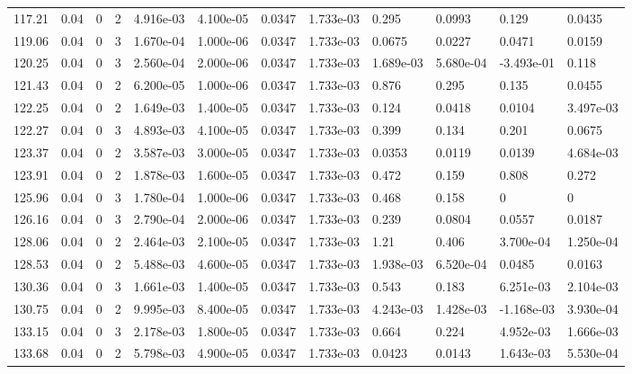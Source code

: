 \documentclass[preview]{standalone}
\begin{document}
{{{{\begin{tabular}{L{1.2cm}C{1.2cm} C{0.3cm}C{0.5cm} C{1.4cm}C{1.4cm} C{1.4cm}C{1.4cm} C{1.6cm}C{1.6cm} C{1.6cm}C{1.6cm}}
  117.21  &  0.04  & 0     &  2 &  4.916e-03  & 4.100e-05  &  0.0347&   1.733e-03& 0.295 & 0.0993   &  0.129 & 0.0435  \\ 
  119.06  &  0.04  & 0     &  3 &  1.670e-04  & 1.000e-06  &  0.0347&   1.733e-03& 0.0675 & 0.0227   &  0.0471 & 0.0159  \\ 
  120.25  &  0.04  & 0     &  3 &  2.560e-04  & 2.000e-06  &  0.0347&   1.733e-03& 1.689e-03 & 5.680e-04   &  -3.493e-01 & 0.118  \\ 
  121.43  &  0.04  & 0     &  2 &  6.200e-05  & 1.000e-06  &  0.0347&   1.733e-03& 0.876 & 0.295   &  0.135 & 0.0455  \\ 
  122.25  &  0.04  & 0     &  2 &  1.649e-03  & 1.400e-05  &  0.0347&   1.733e-03& 0.124 & 0.0418   &  0.0104 & 3.497e-03  \\ 
  122.27  &  0.04  & 0     &  3 &  4.893e-03  & 4.100e-05  &  0.0347&   1.733e-03& 0.399 & 0.134   &  0.201 & 0.0675  \\ 
  123.37  &  0.04  & 0     &  2 &  3.587e-03  & 3.000e-05  &  0.0347&   1.733e-03& 0.0353 & 0.0119   &  0.0139 & 4.684e-03  \\ 
  123.91  &  0.04  & 0     &  2 &  1.878e-03  & 1.600e-05  &  0.0347&   1.733e-03& 0.472 & 0.159   &  0.808 & 0.272  \\ 
  125.96  &  0.04  & 0     &  3 &  1.780e-04  & 1.000e-06  &  0.0347&   1.733e-03& 0.468 & 0.158   &  0 & 0  \\ 
  126.16  &  0.04  & 0     &  3 &  2.790e-04  & 2.000e-06  &  0.0347&   1.733e-03& 0.239 & 0.0804   &  0.0557 & 0.0187  \\ 
  128.06  &  0.04  & 0     &  2 &  2.464e-03  & 2.100e-05  &  0.0347&   1.733e-03& 1.21 & 0.406   &  3.700e-04 & 1.250e-04  \\ 
  128.53  &  0.04  & 0     &  2 &  5.488e-03  & 4.600e-05  &  0.0347&   1.733e-03& 1.938e-03 & 6.520e-04   &  0.0485 & 0.0163  \\ 
  130.36  &  0.04  & 0     &  3 &  1.661e-03  & 1.400e-05  &  0.0347&   1.733e-03& 0.543 & 0.183   &  6.251e-03 & 2.104e-03  \\ 
  130.75  &  0.04  & 0     &  2 &  9.995e-03  & 8.400e-05  &  0.0347&   1.733e-03& 4.243e-03 & 1.428e-03   &  -1.168e-03 & 3.930e-04  \\ 
  133.15  &  0.04  & 0     &  3 &  2.178e-03  & 1.800e-05  &  0.0347&   1.733e-03& 0.664 & 0.224   &  4.952e-03 & 1.666e-03  \\ 
  133.68  &  0.04  & 0     &  2 &  5.798e-03  & 4.900e-05  &  0.0347&   1.733e-03& 0.0423 & 0.0143   &  1.643e-03 & 5.530e-04  \\ 

\end{tabular}}}}}
\end{document}

